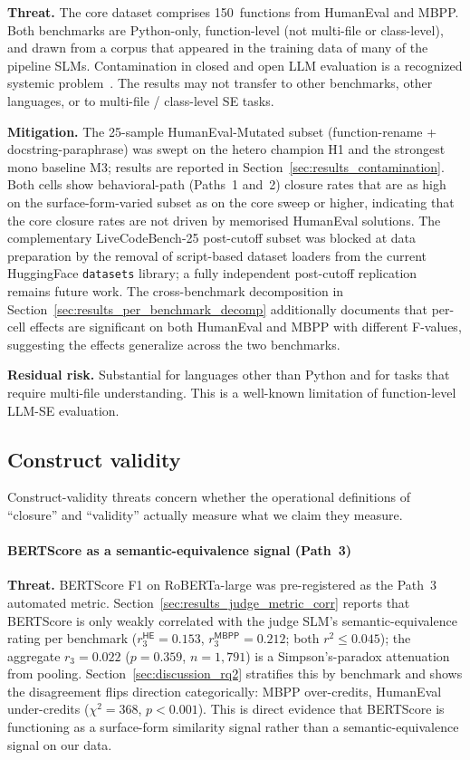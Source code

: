 \textbf{Threat.} The core dataset comprises 150~functions from HumanEval and MBPP. Both benchmarks are Python-only, function-level (not multi-file or class-level), and drawn from a corpus that appeared in the training data of many of the pipeline SLMs. Contamination in closed and open LLM evaluation is a recognized systemic problem~\citep{Balloccu2025LLMDataContamination}. The results may not transfer to other benchmarks, other languages, or to multi-file / class-level SE tasks.

\textbf{Mitigation.} The 25-sample HumanEval-Mutated subset (function-rename + docstring-paraphrase) was swept on the hetero champion H1 and the strongest mono baseline M3; results are reported in Section~\ref{sec:results_contamination}. Both cells show behavioral-path (Paths~1 and~2) closure rates that are as high on the surface-form-varied subset as on the core sweep or higher, indicating that the core closure rates are not driven by memorised HumanEval solutions. The complementary LiveCodeBench-25 post-cutoff subset was blocked at data preparation by the removal of script-based dataset loaders from the current HuggingFace \texttt{datasets} library; a fully independent post-cutoff replication remains future work. The cross-benchmark decomposition in Section~\ref{sec:results_per_benchmark_decomp} additionally documents that per-cell effects are significant on both HumanEval and MBPP with different F-values, suggesting the effects generalize across the two benchmarks.

\textbf{Residual risk.} Substantial for languages other than Python and for tasks that require multi-file understanding. This is a well-known limitation of function-level LLM-SE evaluation.

\subsection{Construct validity}

Construct-validity threats concern whether the operational definitions of ``closure'' and ``validity'' actually measure what we claim they measure.

\paragraph{BERTScore as a semantic-equivalence signal (Path~3)}

\textbf{Threat.} BERTScore F1 on RoBERTa-large was pre-registered as the Path~3 automated metric. Section~\ref{sec:results_judge_metric_corr} reports that BERTScore is only weakly correlated with the judge SLM's semantic-equivalence rating per benchmark ($r_3^{\textsf{HE}} = 0.153$, $r_3^{\textsf{MBPP}} = 0.212$; both $r^2 \leq 0.045$); the aggregate $r_3 = 0.022$ ($p = 0.359$, $n = 1{,}791$) is a Simpson's-paradox attenuation from pooling. Section~\ref{sec:discussion_rq2} stratifies this by benchmark and shows the disagreement flips direction categorically: MBPP over-credits, HumanEval under-credits ($\chi^2 = 368$, $p < 0.001$). This is direct evidence that BERTScore is functioning as a surface-form similarity signal rather than a semantic-equivalence signal on our data.


